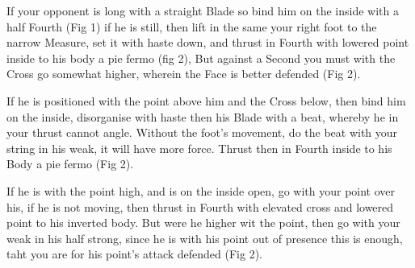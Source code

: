 \newpage


\newpage


\exercise
If your opponent is long with a straight Blade so bind him on the
inside with a half Fourth (Fig 1) if he is still, then lift in the
same your right foot to the narrow Measure, set it with haste down,
and thrust in Fourth with lowered point inside to his body a pie fermo
(fig 2), But against a Second you must with the Cross go somewhat
higher, wherein the Face is better defended (Fig 2).

\exercise
If he is positioned with the point above him and the Cross below, then
bind him on the inside, disorganise with haste then his Blade with a
beat, whereby he in your thrust cannot angle. Without the foot's
movement, do the beat with your string in his weak, it will have more
force. Thrust then in Fourth inside to his Body a pie fermo (Fig 2).


\exercise
If he is with the point high, and is on the inside open, go with your
point over his, if he is not moving, then thrust in Fourth with
elevated cross and lowered point to his inverted body. But were he
higher wit the point, then go with your weak in his half strong, since
he is with his point out of presence this is enough, taht you are for
his point's attack defended (Fig 2).

